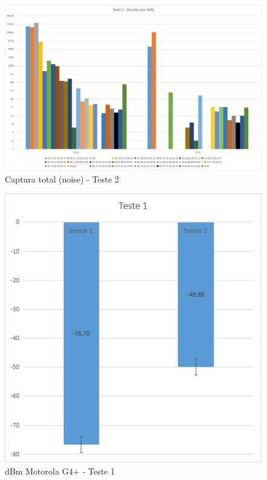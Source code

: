 \begin{figure}[htb]
	\caption{\label{fig:modulos-esp}Captura total (noise) - Teste 2}
	\begin{center}
		\includegraphics[width=1\textwidth]{060-testes/data-analisis/distance-mg4plus-netflix/Teste2.png}
	\end{center}
\end{figure}


\begin{figure}[htb]
	\caption{\label{fig:modulos-esp}dBm Motorola G4+ - Teste 1}
	\begin{center}
		\includegraphics[width=1\textwidth]{060-testes/data-analisis/distance-mg4plus-netflix/target-Teste1.png}
	\end{center}
\end{figure}

